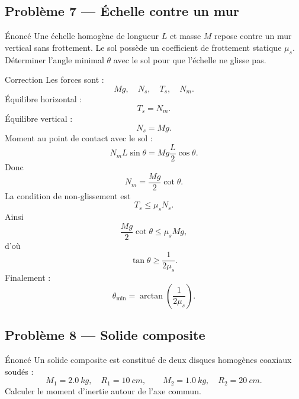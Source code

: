 \documentclass[11pt,a4paper]{article}
\begin{document}
\subsection{Problème 7 — Échelle contre un mur}

\begin{exercisebox}{Énoncé}{}
Une échelle homogène de longueur $L$ et masse $M$ repose contre un mur vertical sans frottement.
Le sol possède un coefficient de frottement statique $\mu_s$.
Déterminer l'angle minimal $\theta$ avec le sol pour que l'échelle ne glisse pas.
\end{exercisebox}

\begin{center}
\end{center}

\begin{correctionbox}{Correction}{}
Les forces sont :
\[
Mg,\quad N_s,\quad T_s,\quad N_m.
\]
Équilibre horizontal :
\[
T_s=N_m.
\]
Équilibre vertical :
\[
N_s=Mg.
\]
Moment au point de contact avec le sol :
\[
N_m L\sin\theta=Mg\frac L2\cos\theta.
\]
Donc
\[
N_m=\frac{Mg}{2}\cot\theta.
\]
La condition de non-glissement est
\[
T_s\leq \mu_s N_s.
\]
Ainsi
\[
\frac{Mg}{2}\cot\theta\leq \mu_s Mg,
\]
d'où
\[
\tan\theta\geq \frac{1}{2\mu_s}.
\]
Finalement :
\[
\theta_{\min}=\arctan\left(\frac{1}{2\mu_s}\right).
\]
\end{correctionbox}

\subsection{Problème 8 — Solide composite}

\begin{exercisebox}{Énoncé}{}
Un solide composite est constitué de deux disques homogènes coaxiaux soudés :
\[
M_1=\SI{2.0}{kg},\quad R_1=\SI{10}{cm},
\qquad
M_2=\SI{1.0}{kg},\quad R_2=\SI{20}{cm}.
\]
Calculer le moment d'inertie autour de l'axe commun.
\end{exercisebox}
\end{document}
